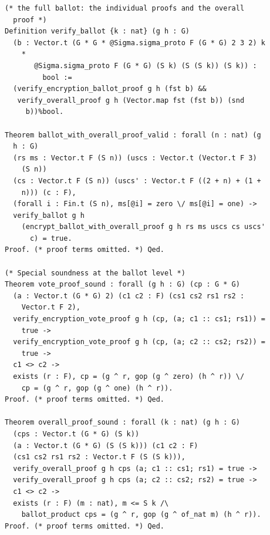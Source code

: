 \documentclass[sigconf,anonymous,review]{acmart}
\begin{document}
\begin{lstlisting}[frame=single, language=Coq, caption={Frontend Functions},
  label={frontend_fun},captionpos=t, basicstyle=\ttfamily\footnotesize,
  abovecaptionskip=-\medskipamount]
(* the full ballot: the individual proofs and the overall
  proof *)
Definition verify_ballot {k : nat} (g h : G)
  (b : Vector.t (G * G * @Sigma.sigma_proto F (G * G) 2 3 2) k
    * 
       @Sigma.sigma_proto F (G * G) (S k) (S (S k)) (S k)) :
         bool :=
  (verify_encryption_ballot_proof g h (fst b) && 
   verify_overall_proof g h (Vector.map fst (fst b)) (snd
     b))%bool.

Theorem ballot_with_overall_proof_valid : forall (n : nat) (g
  h : G) 
  (rs ms : Vector.t F (S n)) (uscs : Vector.t (Vector.t F 3)
    (S n)) 
  (cs : Vector.t F (S n)) (uscs' : Vector.t F ((2 + n) + (1 +
    n))) (c : F),
  (forall i : Fin.t (S n), ms[@i] = zero \/ ms[@i] = one) ->
  verify_ballot g h 
    (encrypt_ballot_with_overall_proof g h rs ms uscs cs uscs'
      c) = true.
Proof. (* proof terms omitted. *) Qed.

(* Special soundness at the ballot level *)
Theorem vote_proof_sound : forall (g h : G) (cp : G * G)
  (a : Vector.t (G * G) 2) (c1 c2 : F) (cs1 cs2 rs1 rs2 :
    Vector.t F 2),
  verify_encryption_vote_proof g h (cp, (a; c1 :: cs1; rs1)) =
    true ->
  verify_encryption_vote_proof g h (cp, (a; c2 :: cs2; rs2)) =
    true ->
  c1 <> c2 ->
  exists (r : F), cp = (g ^ r, gop (g ^ zero) (h ^ r)) \/ 
    cp = (g ^ r, gop (g ^ one) (h ^ r)).
Proof. (* proof terms omitted. *) Qed.

Theorem overall_proof_sound : forall (k : nat) (g h : G) 
  (cps : Vector.t (G * G) (S k))
  (a : Vector.t (G * G) (S (S k))) (c1 c2 : F) 
  (cs1 cs2 rs1 rs2 : Vector.t F (S (S k))),
  verify_overall_proof g h cps (a; c1 :: cs1; rs1) = true ->
  verify_overall_proof g h cps (a; c2 :: cs2; rs2) = true ->
  c1 <> c2 ->
  exists (r : F) (m : nat), m <= S k /\ 
    ballot_product cps = (g ^ r, gop (g ^ of_nat m) (h ^ r)).
Proof. (* proof terms omitted. *) Qed.
\end{lstlisting}
\end{document}
